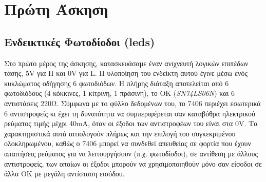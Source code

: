 \documentclass[a4paper,10pt]{article} \usepackage{anysize}
\begin{document}


\section*{Πρώτη Άσκηση} \setcounter{section}{1}
\subsection{Ενδεικτικές Φωτοδίοδοι (leds)} Στο πρώτο μέρος της άσκησης,
κατασκευάσαμε έναν ανιχνευτή λογικών επιπέδων τάσης, 5V για H και 0V για L. Η
υλοποίηση του ενδείκτη αυτού έγινε μέσω ενός κυκλώματος οδήγησης 6 φωτοδιόδων.
Η πλήρης διάταξη αποτελείται από 6 φωτοδιόδους (4 κόκκινες, 1 κίτρινη, 1
πράσινη), το ΟΚ (\textit{SN74LS06N}) και 6 αντιστάσεις 220Ω. Σύμφωνα με το φύλλο δεδομένων
του, το 7406 περιέχει εσωτερικά 6 αντιστροφείς κι έχει τη δυνατότητα να
συμπεριφέρεται σαν καταβόθρα ηλεκτρικού ρεύματος τιμής μέχρι 40mA, όταν οι
έξοδοι των αντιστροφέων του είναι στα 0V. Τα χαρακτηριστικά αυτά αιτιολογούν
πλήρως και την επιλογή του συγκεκριμένου ολοκληρωμένου, καθώς ο 7406 μπορεί να
συνδεθεί απευθείας σε φορτία που έχουν απαιτήσεις ρεύματος για να
λειτουργήσουν (π.χ. φωτοδίοδοι), σε αντίθεση με άλλους αντιστροφείς, των
οποίων οι έξοδοι μπορούν να χρησιμοποιηθούν μόνο σαν είσοδοι σε άλλα ΟΚ με
μεγάλη αντίσταση εισόδου.
\end{document}
